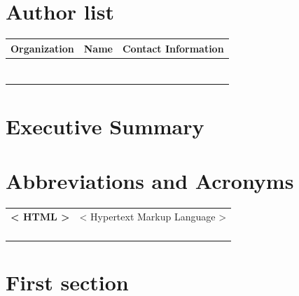 \documentclass[12pt]{article}
\begin{document}
\section*{Author list}
\begin{table}[h]
	\centering
	\begin{tabular}{|l|l|l|}
	\hline
	\cellcolor{lightgray}\textbf{Organization} & \cellcolor{lightgray}\textbf{Name} & \cellcolor{lightgray}\textbf{Contact Information}\\
	\hline
	& & \\
	\hline
	& & \\
	\hline
	& & \\
	\hline
	& & \\
	\hline
	& & \\
	\hline
	& & \\
	\hline
	\multicolumn{3}{p{\linewidth}}{}\\ %
	\end{tabular}
\end{table}

\clearpage

\section*{Executive Summary}

\clearpage
\section*{Abbreviations and Acronyms}
\begin{table}[h]
	\centering

	\begin{tabular}{ll}
	\textbf{< HTML >} & < Hypertext Markup Language > \\
	\textbf{} & \\
	\textbf{} & \\
	\textbf{} & \\
	\multicolumn{2}{p{\linewidth}}{}\\
	\end{tabular}
\end{table}


\clearpage
\tableofcontents
\listoffigures
\listoftables

\clearpage

\section{First section}
\end{document}
